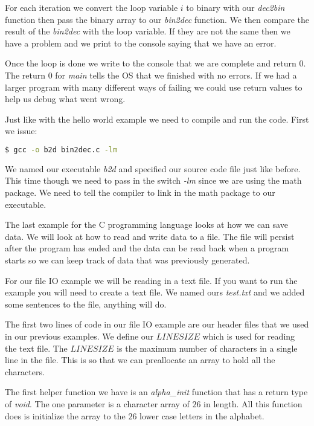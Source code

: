 For each iteration we convert the loop variable $i$ to binary with our \emph{dec2bin} function then pass the binary array to our \emph{bin2dec} function. We then compare the result of the \emph{bin2dec} with the loop variable. If they are not the same then we have a problem and we print to the console saying that we have an error.

Once the loop is done we write to the console that we are complete and return $0$. The return $0$ for \emph{main} tells the \ac{OS} that we finished with no errors. If we had a larger program with many different ways of failing we could use return values to help us debug what went wrong. 



Just like with the hello world example we need to compile and run the code. First we issue:

\begin{lstlisting}[language=bash]
    $ gcc -o b2d bin2dec.c -lm
\end{lstlisting}

We named our executable \emph{b2d} and specified our source code file just like before. This time though we need to pass in the switch \emph{-lm} since we are using the math package. We need to tell the compiler to link in the math package to our executable.

The last example for the C programming language looks at how we can save data. We will look at how to read and write data to a file. The file will persist after the program has ended and the data can be read back when a program starts so we can keep track of data that was previously generated. 

For our file \ac{IO} example we will be reading in a text file. If you want to run the example you will need to create a text file. We named ours \emph{test.txt} and we added some sentences to the file, anything will do. 

The first two lines of code in our file \ac{IO} example are our header files that we used in our previous examples. We define our $LINESIZE$ which is used for reading the text file. The $LINESIZE$ is the maximum number of characters in a single line in the file. This is so that we can preallocate an array to hold all the characters. 

The first helper function we have is an \emph{alpha\_init} function that has a return type of \emph{void}. The one parameter is a character array of $26$ in length. All this function does is initialize the array to the $26$ lower case letters in the alphabet. 

